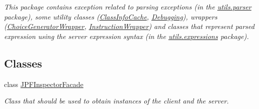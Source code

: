\begin{DoxyCompactItemize}
\begin{DoxyCompactList}\small\item\em This package contains exception related to parsing exceptions (in the \hyperlink{namespacegov_1_1nasa_1_1jpf_1_1inspector_1_1utils_1_1parser}{utils.\+parser} package), some utility classes (\hyperlink{classgov_1_1nasa_1_1jpf_1_1inspector_1_1utils_1_1_class_info_cache}{Class\+Info\+Cache}, \hyperlink{classgov_1_1nasa_1_1jpf_1_1inspector_1_1utils_1_1_debugging}{Debugging}), wrappers (\hyperlink{classgov_1_1nasa_1_1jpf_1_1inspector_1_1utils_1_1_choice_generator_wrapper}{Choice\+Generator\+Wrapper}, \hyperlink{classgov_1_1nasa_1_1jpf_1_1inspector_1_1utils_1_1_instruction_wrapper}{Instruction\+Wrapper}) and classes that represent parsed expression using the server expression syntax (in the \hyperlink{namespacegov_1_1nasa_1_1jpf_1_1inspector_1_1utils_1_1expressions}{utils.\+expressions} package). \end{DoxyCompactList}\end{DoxyCompactItemize}
\subsection*{Classes}
\begin{DoxyCompactItemize}
\item 
class \hyperlink{classgov_1_1nasa_1_1jpf_1_1inspector_1_1_j_p_f_inspector_facade}{J\+P\+F\+Inspector\+Facade}
\begin{DoxyCompactList}\small\item\em Class that should be used to obtain instances of the client and the server. \end{DoxyCompactList}\end{DoxyCompactItemize}
